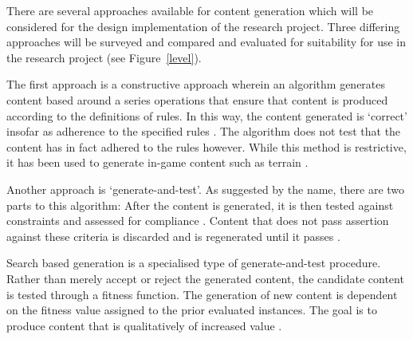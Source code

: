 \documentclass[11pt, a4paper, oneside]{report} %
\begin{document}
There are several approaches available for content generation which will be
considered for the design implementation of the research project. Three
differing approaches will be surveyed and compared and evaluated for suitability
for use in the research project (see Figure~\ref{level}).

The first approach is a constructive approach wherein an algorithm generates
content based around a series operations that ensure that content is produced
according to the definitions of rules. In this way, the content generated is
`correct' insofar as adherence to the specified rules
\cite{browne2008automatic}. The algorithm does not test that the content has in
fact adhered to the rules however. While this method is restrictive, it has been
used to generate in-game content such as terrain
\cite{Miller:1986:DRT:15886.15890}.

Another approach is `generate-and-test'. As suggested by the name, there are two
parts to this algorithm: After the content is generated, it is then tested
against constraints and assessed for compliance \cite{5756645}. Content that
does not pass assertion against these criteria is discarded and is regenerated
until it passes \cite{5756645}.

Search based generation is a specialised type of generate-and-test procedure.
Rather than merely accept or reject the generated content, the candidate content
is tested through a fitness function. The generation of new content is dependent
on the fitness value assigned to the prior evaluated instances. The goal is to
produce content that is qualitatively of increased value \cite{5756645}.



\end{document}
